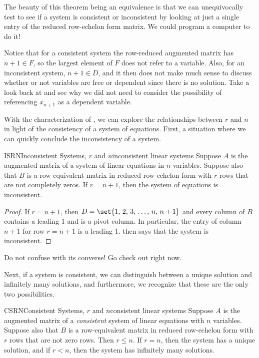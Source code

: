 %
The beauty of this theorem being an equivalence is that we can unequivocally test to see if a system is consistent or inconsistent by looking at just a single entry of the reduced row-echelon form matrix.  We could program a computer to do it!\par
%
%
Notice that for a consistent system the row-reduced augmented matrix has $n+1\in F$, so the largest element of $F$ does not refer to a variable.  Also, for an inconsistent system, $n+1\in D$, and it then does not make much sense to discuss whether or not variables are free or dependent since there is no solution.  Take a look back at  and see why we did not need to consider the possibility of referencing $x_{n+1}$ as a dependent variable.\par
%
With the characterization of , we can explore the relationships between $r$ and $n$ in light of the consistency of a system of equations.  First, a situation where we can quickly conclude the inconsistency of a system.
%
\begin{theorem}{ISRN}{Inconsistent Systems, $r$ and $n$}{inconsistent linear systems}
Suppose $A$ is the augmented matrix of a system of linear equations in $n$ variables.  Suppose also that $B$ is a row-equivalent matrix in reduced row-echelon form with $r$ rows that are not completely zeros.  If $r=n+1$, then the system of equations is inconsistent.
\end{theorem}
%
\begin{proof}
If  $r=n+1$, then $D=\set{1,\,2,\,3,\,\ldots,\,n,\,n+1}$ and every column of $B$ contains a leading 1 and is a pivot column.  In particular, the entry of column $n+1$ for row $r=n+1$ is a leading 1.   then says that the system is inconsistent.
\end{proof}
%
Do not confuse  with its converse!  Go check out  right now.
\par
%
Next, if a system is consistent, we can distinguish between a unique solution and infinitely many solutions, and furthermore, we recognize that these are the only two possibilities.
%
\begin{theorem}{CSRN}{Consistent Systems, $r$ and $n$}{consistent linear systems}
Suppose $A$ is the augmented matrix of a {\em consistent} system of linear equations with $n$ variables.  Suppose also that $B$ is a row-equivalent matrix in reduced row-echelon form with $r$ rows that are not zero rows.  Then $r\leq n$.  If $r=n$, then the system has a unique solution, and if $r<n$, then the system has infinitely many solutions.
\end{theorem}
